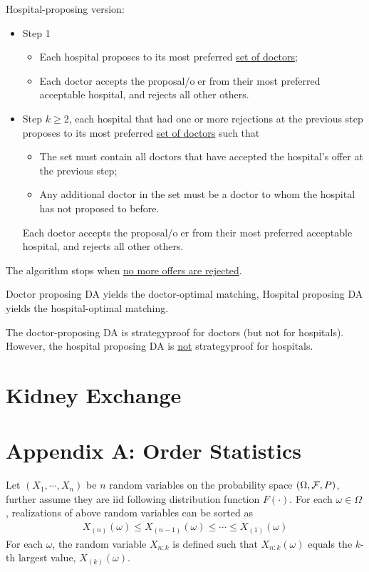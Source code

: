 \documentclass{article}
\begin{document}
	\begin{algorithm}
		Hospital-proposing version:
		\begin{itemize}
			\item Step 1
			\begin{itemize}
				\item Each hospital proposes to its most preferred \ul{set of doctors};
				\item Each doctor accepts the proposal/oer from their most preferred acceptable hospital, and rejects all other others.
			\end{itemize}
			\item Step $k \geq 2$, each hospital that had one or more rejections at the previous step proposes to its most preferred \ul{set of doctors} such that
			\begin{itemize}
				\item The set must contain all doctors that have accepted the hospital's offer at the previous step;
				\item Any additional doctor in the set must be a doctor to whom the hospital has not proposed to before.
			\end{itemize}
			Each doctor accepts the proposal/oer from their most preferred acceptable hospital, and rejects all other others.
		\end{itemize}
		The algorithm stops when \ul{no more offers are rejected}.
	\end{algorithm}
	
	\begin{proposition}
		Doctor proposing DA yields the doctor-optimal matching, Hospital proposing DA yields the hospital-optimal matching.
	\end{proposition}
	
	\begin{proposition}
		The doctor-proposing DA is strategyproof for doctors (but not for hospitals).
		However, the hospital proposing DA is \ul{not} strategyproof for hospitals.
	\end{proposition}
	
	\section{Kidney Exchange}

	\section{Appendix A: Order Statistics}
	\begin{definition}
		Let $(X_1, \cdots, X_n)$ be $n$ random variables on the probability space $(\Omega, \mathcal{{F}}, P)$, further assume they are iid following distribution function $F(\cdot)$. For each $\omega \in \Omega$, realizations of above random variables can be sorted as
		\begin{align}
			X_{(n)}(\omega) \leq X_{(n-1)}(\omega) \leq \cdots \leq X_{(1)}(\omega)
		\end{align}
		For each $\omega$, the random variable $X_{n:k}$ is defined such that $X_{n:k}(\omega)$ equals the $k$-th largest value, $X_{(k)}(\omega)$.
	\end{definition}
	
\end{document}
